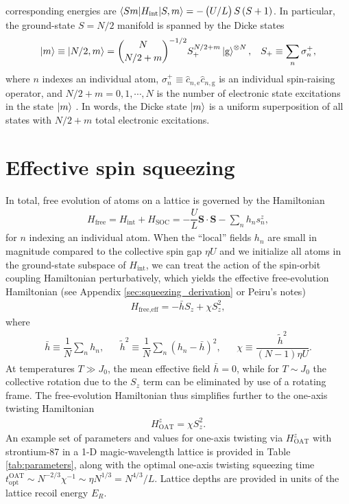 \documentclass[aps,notitlepage,nofootinbib,11pt]{revtex4-1}
\renewcommand{\t}{\text} %
\newcommand{\f}[2]{\dfrac{#1}{#2}} %
\newcommand{\p}[1]{\left(#1\right)} %
\renewcommand{\v}{\bm} %
\renewcommand{\c}{\cdot} %
\newcommand{\bk}{\braket} %
\newcommand{\g}{\text{g}} %
\newcommand{\e}{\text{e}}
\newcommand{\1}{\mathds{1}}
\begin{document}
corresponding energies are $\bk{Sm|H_{\t{int}}|S,m}=-\p{U/L}S\p{S+1}$.
In particular, the ground-state $S=N/2$ manifold is spanned by the
Dicke states
\begin{align}
  \ket{m} \equiv \ket{N/2,m}
  = {N \choose N/2+m}^{-1/2} S_+^{N/2+m} \ket{\g}^{\otimes N},
  &&
  S_+ \equiv \sum_n \sigma_n^+,
  \label{eq:dicke_states}
\end{align}
where $n$ indexes an individual atom,
$\sigma_n^+\equiv\hat c_{n,\e}\hat c_{n,\g}$ is an individual
spin-raising operator, and $N/2+m=0,1,\cdots,N$ is the number of
electronic state excitations in the state $\ket{m}$
\cite{swallows2011suppression}.  In words, the Dicke state $\ket{m}$
is a uniform superposition of all states with $N/2+m$ total electronic
excitations.


\section{Effective spin squeezing}
\label{sec:OAT}

In total, free evolution of atoms on a lattice is governed by the
Hamiltonian
\begin{align}
  H_{\t{free}}
  = H_{\t{int}} + H_{\t{SOC}}
  = -\f{U}{L} \v S\c\v S - \sum_n h_n s_n^z,
\end{align}
for $n$ indexing an individual atom.  When the ``local'' fields $h_n$
are small in magnitude compared to the collective spin gap $\eta U$
and we initialize all atoms in the ground-state subspace of
$H_{\t{int}}$, we can treat the action of the spin-orbit coupling
Hamiltonian perturbatively, which yields the effective free-evolution
Hamiltonian (see Appendix \ref{sec:squeezing_derivation} or Peiru's
notes)
\begin{align}
  H_{\t{free,eff}} = -\bar h S_z + \chi S_z^2,
\end{align}
where
\begin{align}
  \bar h \equiv \f1N \sum_n h_n,
  &&
  \tilde h^2 \equiv \f1N \sum_n \p{h_n - \bar h}^2,
  &&
  \chi \equiv \f{\tilde h^2}{\p{N-1}\eta U}.
\end{align}
At temperatures $T\gg J_0$, the mean effective field $\bar h=0$, while
for $T\sim J_0$ the collective rotation due to the $S_z$ term can be
eliminated by use of a rotating frame.  The free-evolution Hamiltonian
thus simplifies further to the one-axis twisting Hamiltonian
\begin{align}
  H_{\t{OAT}}^z = \chi S_z^2.
  \label{eq:H_OAT}
\end{align}
An example set of parameters and values for one-axis twisting via
$H_{\t{OAT}}^z$ with strontium-87 in a 1-D magic-wavelength lattice is
provided in Table \ref{tab:parameters}, along with the optimal
one-axis twisting squeezing time
$t_{\t{opt}}^{\t{OAT}}\sim N^{-2/3}\chi^{-1}\sim\eta
N^{1/3}=N^{4/3}/L$.  Lattice depths are provided in units of the
lattice recoil energy $E_R$.
\end{document}

